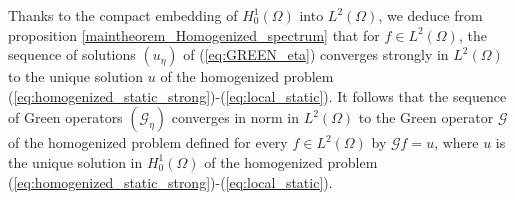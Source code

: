 \documentclass[a4paper,reqno]{amsart}
\numberwithin{equation}{section}
\numberwithin{equation}{section}		%
\numberwithin{figure}{section}			%
\numberwithin{table}{section}				%
\newcommand{\R}{\mathbb{R}}
\newtheorem{proposition}[theorem]{Proposition}
\theoremstyle{definition}
\newtheorem{remark}[theorem]{Remark}
\newcommand{\<}{\ensuremath \leq}
\renewcommand{\>}{\ensuremath \geq}
\def\e{\eta}
\begin{document}



Thanks to the compact embedding of $H^1_0(\Omega)$ into $L^2(\Omega)$, we deduce from proposition \ref{maintheorem_Homogenized_spectrum} that for $f\in L^2(\Omega)$, the sequence of solutions  $(u_\e)$ of (\ref{eq:GREEN_eta}) converges strongly in $L^{2}(\Omega)$ to the unique solution $u$ of the homogenized problem (\ref{eq:homogenized_static_strong})-(\ref{eq:local_static}). It follows that the sequence of Green operators $({\mathcal G}_\eta)$ converges in norm in $L^2(\Omega)$ to the Green operator ${\mathcal G}$ of the homogenized problem defined for every $f\in L^2(\Omega)$ by ${\mathcal G} f=u$, where $u$ is the unique solution in $H^1_0(\Omega)$ of the homogenized problem (\ref{eq:homogenized_static_strong})-(\ref{eq:local_static}).
\end{document}
